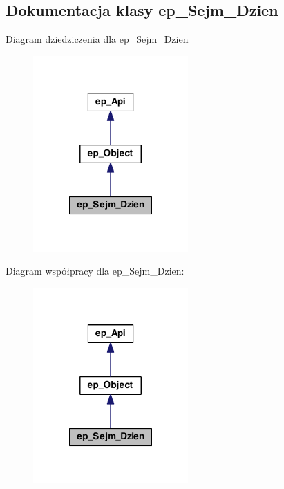 \hypertarget{classep___sejm___dzien}{\subsection{Dokumentacja klasy ep\-\_\-\-Sejm\-\_\-\-Dzien}
\label{classep___sejm___dzien}
}


Diagram dziedziczenia dla ep\-\_\-\-Sejm\-\_\-\-Dzien\nopagebreak
\begin{figure}[H]
\begin{center}
\leavevmode
\includegraphics[width=168pt]{classep___sejm___dzien__inherit__graph}
\end{center}
\end{figure}


Diagram współpracy dla ep\-\_\-\-Sejm\-\_\-\-Dzien\-:\nopagebreak
\begin{figure}[H]
\begin{center}
\leavevmode
\includegraphics[width=168pt]{classep___sejm___dzien__coll__graph}
\end{center}
\end{figure}
